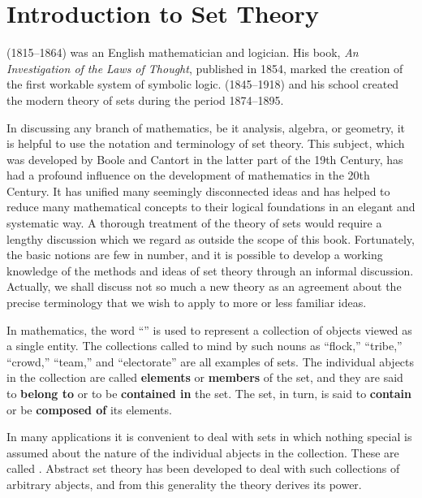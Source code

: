 \section{Introduction to Set Theory}\label{sec:1.2.1}

\begin{note}
   (1815--1864) was an English mathematician and logician.
  His book, \emph{An Investigation of the Laws of Thought}, published in 1854, marked the creation of the first workable system of symbolic logic.
   (1845--1918) and his school created the modern theory of sets during the period 1874--1895.
\end{note}

\begin{note}
  In discussing any branch of mathematics, be it analysis, algebra, or geometry, it is helpful to use the notation and terminology of set theory.
  This subject, which was developed by Boole and Cantort in the latter part of the 19th Century, has had a profound influence on the development of mathematics in the 20th Century.
  It has unified many seemingly disconnected ideas and has helped to reduce many mathematical concepts to their logical foundations in an elegant and systematic way.
  A thorough treatment of the theory of sets would require a lengthy discussion which we regard as outside the scope of this book.
  Fortunately, the basic notions are few in number, and it is possible to develop a working knowledge of the methods and ideas of set theory through an informal discussion.
  Actually, we shall discuss not so much a new theory as an agreement about the precise terminology that we wish to apply to more or less familiar ideas.
\end{note}

\begin{defn}\label{defn:1.2.1}
  In mathematics, the word ``\textbf{}'' is used to represent a collection of objects viewed as a single entity.
  The collections called to mind by such nouns as ``flock,'' ``tribe,'' ``crowd,'' ``team,'' and ``electorate'' are all examples of sets.
  The individual abjects in the collection are called \textbf{elements} or \textbf{members} of the set, and they are said to \textbf{belong to} or to be \textbf{contained in} the set.
  The set, in turn, is said to \textbf{contain} or be \textbf{composed of} its elements.
\end{defn}

\begin{note}
  In many applications it is convenient to deal with sets in which nothing special is assumed about the nature of the individual abjects in the collection.
  These are called \textbf{}.
  Abstract set theory has been developed to deal with such collections of arbitrary abjects, and from this generality the theory derives its power.
\end{note}
